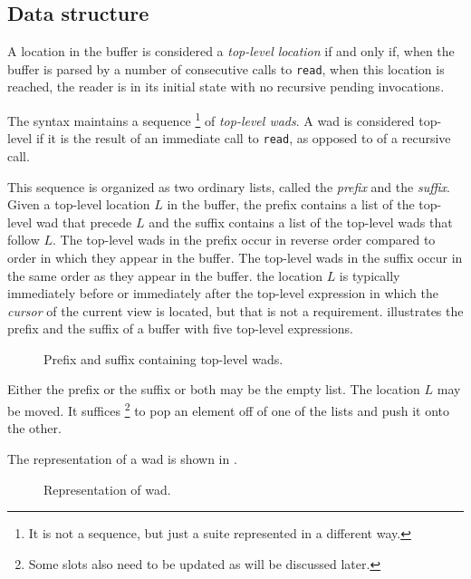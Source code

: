 \subsection{Data structure}
\label{sec-common-lisp-mode-syntax-data-structure}

A location in the buffer is considered a \emph{top-level location} if
and only if, when the buffer is parsed by a number of consecutive
calls to \texttt{read}, when this location is reached, the reader is
in its initial state with no recursive pending invocations.

The \commonlisp{} syntax maintains a sequence%
\footnote{It is not a \commonlisp{} sequence, but just a suite
  represented in a different way.}  of \emph{top-level wads}.
A wad is considered top-level if it is the result of an
immediate call to \texttt{read}, as opposed to of a recursive call.

This sequence is organized as two ordinary \commonlisp{} lists, called
the \emph{prefix} and the \emph{suffix}.  Given a top-level location
$L$ in the buffer, the prefix contains a list of the top-level wad
that precede $L$ and the suffix contains a list of the
top-level wads that follow $L$.  The top-level wads
in the prefix occur in reverse order compared to order in which they
appear in the buffer.  The top-level wads in the suffix occur
in the same order as they appear in the buffer.  the location $L$ is
typically immediately before or immediately after the top-level
expression in which the \emph{cursor} of the current view is located,
but that is not a requirement.  
illustrates the prefix and the suffix of a buffer with five top-level
expressions.

\begin{figure}
\begin{center}
\end{center}
\caption{\label{fig-cl-parser-prefix-suffix}
Prefix and suffix containing top-level wads.}
\end{figure}

Either the prefix or the suffix or both may be the empty list.  The
location $L$ may be moved.  It suffices%
\footnote{Some slots also need to be updated as will be discussed later.}
to pop an element off of one
of the lists and push it onto the other.

The representation of a wad is shown in
.

\begin{figure}
\begin{center}
\end{center}
\caption{\label{fig-wad}
Representation of wad.}
\end{figure}

